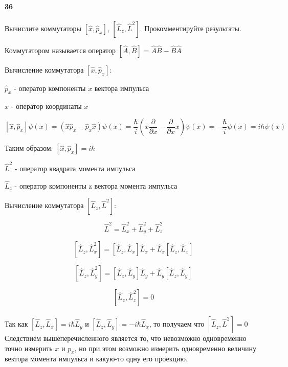 


\paragraph{36}
Вычислите коммутаторы $\left[\hat{x},\hat{p}_x\right]$, $\left[\hat{L}_z,\hat{L}^2\right]$. Прокомментируйте результаты.\\

\begin{definition}
Коммутатором называется оператор $\left[\hat{A},\hat{B}\right]=\hat{A}\hat{B}-\hat{B}\hat{A}$\\
\end{definition}

Вычисление коммутатора  $\left[\hat{x},\hat{p}_x\right]$:\\

\begin{definition}
$\hat{p}_x$ - оператор компоненты $x$ вектора импульса 
\end{definition}

\begin{definition}
$\hat{x}$ - оператор координаты $x$
\end{definition}

$$\left[\hat{x},\hat{p}_x\right]\psi(x) = \left(\hat{x}\hat{p}_x - \hat{p}_x\hat{x}\right)\psi(x) = \frac{\hbar}{i}\left(x\frac{\partial}{\partial x}-\frac{\partial}{\partial x}x\right)\psi(x)=-\frac{\hbar}{i}\psi(x) = i\hbar\psi(x)$$

Таким образом:  $\left[\hat{x},\hat{p}_x\right] = i\hbar$\\

\begin{definition}
$\hat{L}^2$ - оператор квадрата момента импульса
\end{definition}

\begin{definition}
$\hat{L}_z$ - оператор компоненты z вектора момента импульса 
\end{definition}

Вычисление коммутатора $\left[\hat{L}_z,\hat{L}^2\right]$:

$$\hat{L}^2 = \hat{L}_x^2+\hat{L}_y^2+\hat{L}_z^2$$

$$\left[ \hat{L}_z,\hat{L}_x^2\right]=\left[\hat{L}_z,\hat{L}_x\right]\hat{L}_x+\hat{L}_x\left[\hat{L}_z,\hat{L}_x\right]$$

$$\left[ \hat{L}_z,\hat{L}_y^2\right]=\left[\hat{L}_z,\hat{L}_y\right]\hat{L}_y+\hat{L}_y\left[\hat{L}_z,\hat{L}_y\right]$$

$$\left[ \hat{L}_z,\hat{L}_z^2\right]=0$$\\

Так как $\left[\hat{L}_z,\hat{L}_x\right]=i\hbar\hat{L}_y$ и $\left[\hat{L}_z,\hat{L}_y\right] = -i\hbar\hat{L}_x$, то получаем что $\left[\hat{L}_z,\hat{L}^2\right]=0$\\

Следствием вышеперечисленного является то, что невозможно одновременно точно измерить $x$ и $p_x$, но при этом возможно измерить одновременно величину вектора момента импульса и какую-то одну его проекцию.

